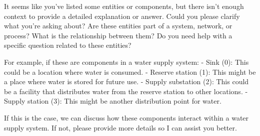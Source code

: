 It seems like you've listed some entities or components, but there isn't enough context to provide a detailed explanation or answer. Could you please clarify what you're asking about? Are these entities part of a system, network, or process? What is the relationship between them? Do you need help with a specific question related to these entities?

For example, if these are components in a water supply system:
- Sink (0): This could be a location where water is consumed.
- Reserve station (1): This might be a place where water is stored for future use.
- Supply substation (2): This could be a facility that distributes water from the reserve station to other locations.
- Supply station (3): This might be another distribution point for water.

If this is the case, we can discuss how these components interact within a water supply system. If not, please provide more details so I can assist you better.